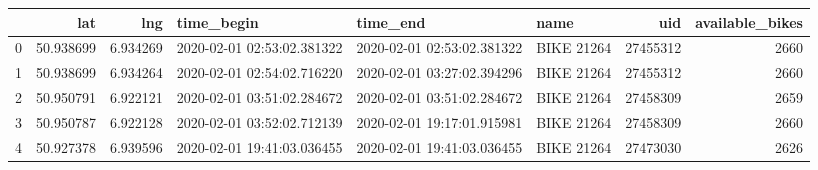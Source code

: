 \begin{tabular}{lrrlllrr}
\toprule
{} &        lat &       lng &                  time\_begin &                    time\_end &        name &       uid &  available\_bikes \\
\midrule
0 &  50.938699 &  6.934269 &  2020-02-01 02:53:02.381322 &  2020-02-01 02:53:02.381322 &  BIKE 21264 &  27455312 &             2660 \\
1 &  50.938699 &  6.934264 &  2020-02-01 02:54:02.716220 &  2020-02-01 03:27:02.394296 &  BIKE 21264 &  27455312 &             2660 \\
2 &  50.950791 &  6.922121 &  2020-02-01 03:51:02.284672 &  2020-02-01 03:51:02.284672 &  BIKE 21264 &  27458309 &             2659 \\
3 &  50.950787 &  6.922128 &  2020-02-01 03:52:02.712139 &  2020-02-01 19:17:01.915981 &  BIKE 21264 &  27458309 &             2660 \\
4 &  50.927378 &  6.939596 &  2020-02-01 19:41:03.036455 &  2020-02-01 19:41:03.036455 &  BIKE 21264 &  27473030 &             2626 \\
\bottomrule
\end{tabular}
